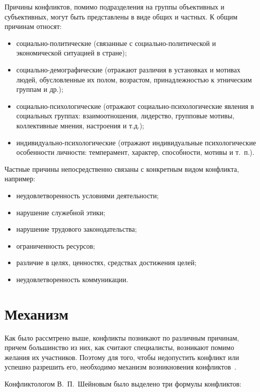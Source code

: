 Причины конфликтов, помимо подразделения на группы объективных и субъективных,
могут быть представлены в виде общих и частных. К общим причинам относят:
\begin{itemize}
    \item социально-политические (связанные с социально-политической и
        экономической ситуацией в стране);
    \item социально-демографические (отражают различия в установках и мотивах
        людей, обусловленные их полом, возрастом, принадлежностью к этническим
        группам и др.);
    \item социально-психологические (отражают социально-психологические явления
        в социальных группах: взаимоотношения, лидерство, групповые мотивы,
        коллективные мнения, настроения и т.д.);
    \item индивидуально-психологические (отражают индивидуальные
        психологические особенности личности: темперамент, характер,
        способности, мотивы и т.~п.).
\end{itemize}

Частные причины непосредственно связаны с конкретным видом конфликта,
например:
\begin{itemize}
    \item неудовлетворенность условиями деятельности;
    \item нарушение служебной этики;
    \item нарушение трудового законодательства;
    \item ограниченность ресурсов;
    \item различие в целях, ценностях, средствах достижения целей;
    \item неудовлетворенность коммуникации.
\end{itemize}

\section{Механизм}

Как было рассмтрено выше, конфликты позникают по различным причинам,
причем большинство из них, как считают специалисты, возникают помимо желания
их участников. Поэтому для того, чтобы недопустить конфликт или успешно
разрешить его, необходимо механизм возникновения конфликтов~\cite{art02}.

Конфликтологом В.~П.~Шейновым было выделено три формулы
конфликтов:

